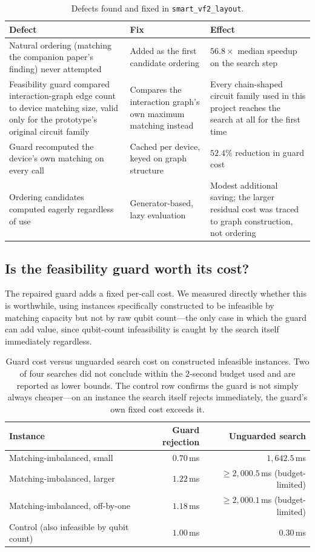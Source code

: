 \documentclass[11pt]{article}
\begin{document}
\begin{table}[h]
\centering
\begin{tabular}{p{}p{}p{}}
\toprule
Defect & Fix & Effect \\
\midrule
Natural ordering (matching the companion paper's finding) never
attempted & Added as the first candidate ordering & $56.8\times$ median
speedup on the search step \\
Feasibility guard compared interaction-graph edge count to device
matching size, valid only for the prototype's original circuit family &
Compares the interaction graph's own maximum matching instead & Every
chain-shaped circuit family used in this project reaches the search at
all for the first time \\
Guard recomputed the device's own matching on every call &
Cached per device, keyed on graph structure & $52.4\%$ reduction in
guard cost \\
Ordering candidates computed eagerly regardless of use &
Generator-based, lazy evaluation & Modest additional saving; the larger
residual cost was traced to graph construction, not ordering \\
\bottomrule
\end{tabular}
\caption{Defects found and fixed in \texttt{smart\_vf2\_layout}.}
\label{tab:fixes}
\end{table}

\subsection{Is the feasibility guard worth its cost?}

The repaired guard adds a fixed per-call cost. We measured directly
whether this is worthwhile, using instances specifically constructed to
be infeasible by matching capacity but not by raw qubit count---the
only case in which the guard can add value, since qubit-count
infeasibility is caught by the search itself immediately regardless.

\begin{table}[h]
\centering
\begin{tabular}{lrr}
\toprule
Instance & Guard rejection & Unguarded search \\
\midrule
Matching-imbalanced, small & $0.70$\,ms & $1{,}642.5$\,ms \\
Matching-imbalanced, larger & $1.22$\,ms & $\geq 2{,}000.5$\,ms (budget-limited) \\
Matching-imbalanced, off-by-one & $1.18$\,ms & $\geq 2{,}000.1$\,ms (budget-limited) \\
Control (also infeasible by qubit count) & $1.00$\,ms & $0.30$\,ms \\
\bottomrule
\end{tabular}
\caption{Guard cost versus unguarded search cost on constructed
infeasible instances. Two of four searches did not conclude within the
$2$-second budget used and are reported as lower bounds. The control
row confirms the guard is not simply always cheaper---on an instance
the search itself rejects immediately, the guard's own fixed cost
exceeds it.}
\label{tab:guard}
\end{table}
\end{document}
